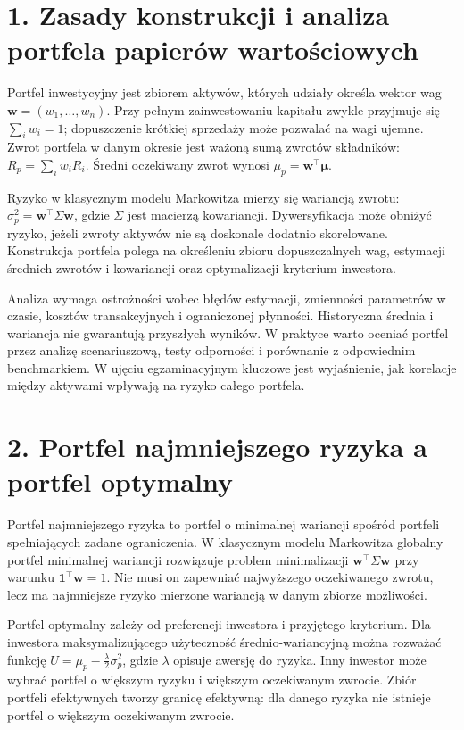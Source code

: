 \documentclass[11pt,a4paper,oneside]{report}
\begin{document}
\section{1. Zasady konstrukcji i analiza portfela papierów wartościowych}
Portfel inwestycyjny jest zbiorem aktywów, których udziały określa wektor wag \(\mathbf w=(w_1,\ldots,w_n)\). Przy pełnym zainwestowaniu kapitału zwykle przyjmuje się \(\sum_iw_i=1\); dopuszczenie krótkiej sprzedaży może pozwalać na wagi ujemne. Zwrot portfela w danym okresie jest ważoną sumą zwrotów składników: \(R_p=\sum_iw_iR_i\). Średni oczekiwany zwrot wynosi \(\mu_p=\mathbf w^\top\boldsymbol\mu\).

Ryzyko w klasycznym modelu Markowitza mierzy się wariancją zwrotu: \(\sigma_p^2=\mathbf w^\top\Sigma\mathbf w\), gdzie \(\Sigma\) jest macierzą kowariancji. Dywersyfikacja może obniżyć ryzyko, jeżeli zwroty aktywów nie są doskonale dodatnio skorelowane. Konstrukcja portfela polega na określeniu zbioru dopuszczalnych wag, estymacji średnich zwrotów i kowariancji oraz optymalizacji kryterium inwestora.

Analiza wymaga ostrożności wobec błędów estymacji, zmienności parametrów w czasie, kosztów transakcyjnych i ograniczonej płynności. Historyczna średnia i wariancja nie gwarantują przyszłych wyników. W praktyce warto oceniać portfel przez analizę scenariuszową, testy odporności i porównanie z odpowiednim benchmarkiem. W ujęciu egzaminacyjnym kluczowe jest wyjaśnienie, jak korelacje między aktywami wpływają na ryzyko całego portfela.

\section{2. Portfel najmniejszego ryzyka a portfel optymalny}
Portfel najmniejszego ryzyka to portfel o minimalnej wariancji spośród portfeli spełniających zadane ograniczenia. W klasycznym modelu Markowitza globalny portfel minimalnej wariancji rozwiązuje problem minimalizacji \(\mathbf w^\top\Sigma\mathbf w\) przy warunku \(\mathbf 1^\top\mathbf w=1\). Nie musi on zapewniać najwyższego oczekiwanego zwrotu, lecz ma najmniejsze ryzyko mierzone wariancją w danym zbiorze możliwości.

Portfel optymalny zależy od preferencji inwestora i przyjętego kryterium. Dla inwestora maksymalizującego użyteczność średnio-wariancyjną można rozważać funkcję \(U=\mu_p-\frac{\lambda}{2}\sigma_p^2\), gdzie \(\lambda\) opisuje awersję do ryzyka. Inny inwestor może wybrać portfel o większym ryzyku i większym oczekiwanym zwrocie. Zbiór portfeli efektywnych tworzy granicę efektywną: dla danego ryzyka nie istnieje portfel o większym oczekiwanym zwrocie.
\end{document}
